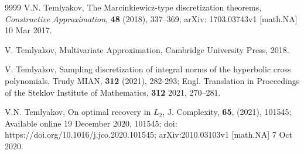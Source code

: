 \documentclass[12pt]{article}
\numberwithin{equation}{section}
\begin{document}
\begin{thebibliography}{9999}
 V.N. Temlyakov, The Marcinkiewicz-type discretization theorems, {\it Constructive Approximation}, {\bf 48} (2018), 337--369; arXiv: 1703.03743v1 [math.NA] 10 Mar 2017.

 V. Temlyakov, Multivariate Approximation, Cambridge University Press, 2018.

 V. Temlyakov, Sampling discretization of integral norms of the hyperbolic cross polynomials, Trudy MIAN, {\bf 312} (2021), 282-293; Engl. Translation in Proceedings of the Steklov Institute of Mathematics, {\bf 312} 2021, 270--281.

 V.N. Temlyakov, On optimal recovery in $L_2$, J. Complexity, {\bf 65}, (2021), 101545; Available online 19 December 2020, 101545;
doi: https://doi.org/10.1016/j.jco.2020.101545;
arXiv:2010.03103v1 [math.NA] 7 Oct 2020. 



 \end{thebibliography}

\Addresses
\end{document}
